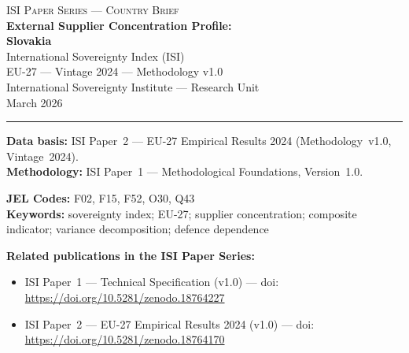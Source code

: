 \documentclass[12pt,a4paper]{article}
\begin{document}
\hypersetup{pageanchor=false}

\begin{titlepage}
\centering
\vspace*{2cm}
{\Large\textsc{ISI Paper Series --- Country Brief}}\\[1.2cm]
{\LARGE\bfseries External Supplier Concentration Profile:\\[0.3em]
Slovakia}\\[1.5cm]
{\large International Sovereignty Index (ISI)\\[0.3em]
EU-27 --- Vintage 2024 --- Methodology v1.0}\\[1.2cm]
{\large International Sovereignty Institute --- Research Unit}\\[0.8cm]
{\large March 2026}

\vspace{0.8cm}
\noindent\rule{\textwidth}{0.4pt}
\vspace{0.4cm}

\begin{flushleft}
\noindent\textbf{Data basis:} ISI Paper~2 --- EU-27 Empirical Results 2024 (Methodology~v1.0, Vintage~2024).\\[4pt]
\noindent\textbf{Methodology:} ISI Paper~1 --- Methodological Foundations, Version~1.0.

\medskip

\noindent\textbf{JEL Codes:} F02, F15, F52, O30, Q43\\[4pt]
\noindent\textbf{Keywords:} sovereignty index; EU-27; supplier concentration; composite indicator; variance decomposition; defence dependence

\medskip

\noindent\textbf{Related publications in the ISI Paper Series:}
\begin{itemize}[nosep,leftmargin=1.5em]
\item ISI Paper~1 --- Technical Specification (v1.0) --- doi:\\
  \url{https://doi.org/10.5281/zenodo.18764227}
\item ISI Paper~2 --- EU-27 Empirical Results 2024 (v1.0) --- doi:\\
  \url{https://doi.org/10.5281/zenodo.18764170}
\end{itemize}
\end{flushleft}
\vfill
\end{titlepage}
\end{document}
